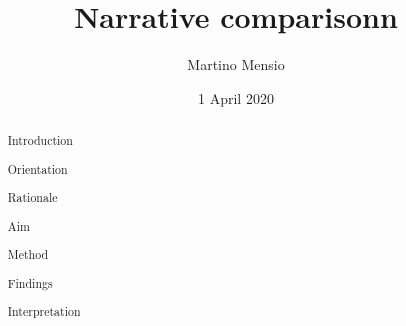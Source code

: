 \documentclass{article}
\title{Narrative comparisonn}
\author{Martino Mensio}
\date{1 April 2020}
\begin{document}
\maketitle

\begin{abstract}
	Introduction
	
	Orientation
	
	Rationale
	
	Aim
	
	Method
	
	Findings
	
	Interpretation
\end{abstract}
\end{document}
